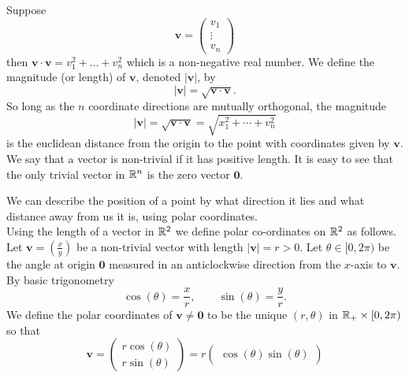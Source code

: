 \documentclass[10pt, a4paper]{article}
\newcommand{\mbf}[1]{\mathbf{#1}}
\begin{document}
\begin{definition}[Magnitude]
    Suppose
    \[
    \mbf{v} = \begin{pmatrix}
        v_1 \\
        \vdots \\
        v_n
    \end{pmatrix}
    \]
    then $\mbf{v \cdot v} = v_1 ^ 2 + \dotsc + v_n ^ 2$ which is a non-negative real number. We define the magnitude (or length) of $\mbf{v}$, denoted $|\mbf{v}|$, by
    \[
    |\mbf{v}| = \sqrt{\mbf{v \cdot v}}.
    \]
    So long as the $n$ coordinate directions are mutually orthogonal, the magnitude
    \[
    |\mbf{v}| = \sqrt{\mbf{v \cdot v}} = \sqrt{x_1 ^ 2 + \cdots + v_n ^ 2}
    \]
    is the euclidean distance from the origin to the point with coordinates given by $\mbf{v}$. We say that a vector is non-trivial if it has positive length. It is easy to see that the only trivial vector in $\mathbb{R} ^ n$ is the zero vector $\mbf{0}$.
\end{definition}


We can describe the position of a point by what direction it lies and what distance away from us it is, using polar coordinates. \\


Using the length of a vector in $\mathbb{R} ^ 2$ we define polar co-ordinates on $\mathbb{R} ^ 2$ as follows. Let $\mbf{v} = \left(\frac{x}{y}\right)$ be a non-trivial vector with length $|\mbf{v}| = r > 0$. Let $\theta \in [0, 2\pi)$ be the angle at origin $\mbf{0}$ measured in an anticlockwise direction from the $x$-axis to $\mbf{v}$. By basic trigonometry
\[
\cos(\theta) = \frac{x}{r},\qquad\sin(\theta) = \frac{y}{r}.
\]
We define the polar coordinates of $\mbf{v \neq 0}$ to be the unique $(r, \theta)$ in $\mathbb{R}_+ \times [0, 2\pi)$ so that
\[
\mbf{v} = \begin{pmatrix}
    r\cos(\theta) \\
    r\sin(\theta)
\end{pmatrix}
=
r\begin{pmatrix}
    \cos(\theta)
    \sin(\theta)
\end{pmatrix}
\]
\end{document}
